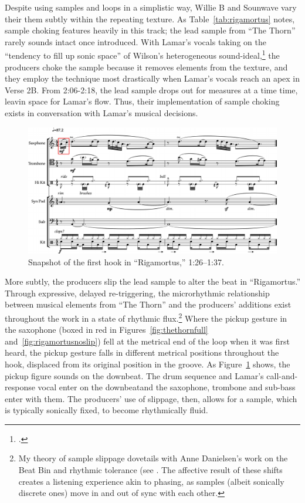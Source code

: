 Despite using samples and loops in a simplistic way, Willie B and Sounwave vary their them
subtly within the repeating texture. As Table~\ref{tab:rigamortus} notes, sample choking
features heavily in this track; the lead sample from ``The Thorn'' rarely sounds intact once
introduced. With Lamar's vocals taking on the ``tendency to fill up sonic space'' of Wilson's
heterogeneous sound-ideal,\footnote{
    \autocite[328]{ollywilsonHeterogeneousSoundIdeal1992}.} 
the producers choke the sample because it removes elements from the texture, and they employ
the technique most drastically when Lamar's vocals reach an apex in Verse 2B. From 2:06-2:18,
the lead sample drops out for measures at a time time, leavin space for Lamar's flow. Thus,
their implementation of sample choking exists in conversation with Lamar's musical decisions.

\begin{figure}[htp]
    \centering
    \includegraphics[width=\textwidth]{images/figures/chp 02/126137rigamortusslip.pdf}
    \caption{Snapshot of the first hook in ``Rigamortus,'' 1:26--1:37.}
    \label{fig:rigamortusslip}
\end{figure}

More subtly, the producers slip the lead sample to alter the beat in ``Rigamortus.'' Through
expressive, delayed re-triggering, the microrhythmic relationship between musical elements from
``The Thorn'' and the producers' additions exist throughout the work in a state of rhythmic 
flux.\footnote{
    My theory of sample slippage dovetails with Anne Danielsen's work on the Beat Bin and 
    rhythmic tolerance (see \autocite[29\textit{ff}.]{annedanielsenHereThereEverywhere2016}. 
    The affective result of these shifts creates a listening experience akin to phasing, 
    as samples (albeit sonically discrete ones) move in and out of sync with each other.}
Where the pickup gesture in the saxophone (boxed in red in Figures~\ref{fig:thethornfull}
and~\ref{fig:rigamortusnoslip}) fell at the metrical end of the loop when it was first heard,
the pickup gesture falls in different metrical positions throughout the hook, displaced from
its original position in the groove. As Figure~\ref{fig:rigamortusslip} shows, the pickup 
figure sounds on the downbeat. The drum sequence and Lamar's call-and-response vocal enter 
on the downbeat\textemdash and the saxophone, trombone and sub-bass enter with them. The 
producers' use of slippage, then, allows for a sample, which is typically sonically fixed,
to become rhythmically fluid.

